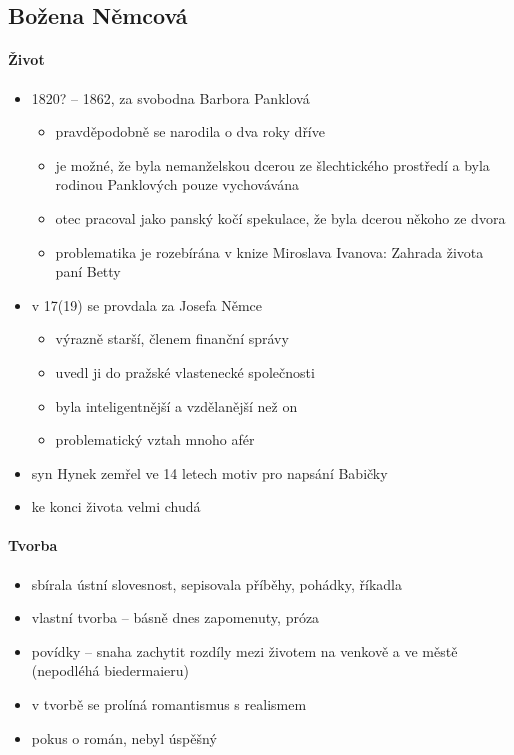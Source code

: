 \subsection{Božena Němcová}
\paragraph{Život}
\begin{itemize}
\item 1820? -- 1862, za svobodna Barbora Panklová
	\begin{itemize}
	\item pravděpodobně se narodila o dva roky dříve
	\item je možné, že byla nemanželskou dcerou ze šlechtického prostředí a byla rodinou Panklových pouze vychovávána
	\item otec pracoval jako panský kočí \ra spekulace, že byla dcerou někoho ze dvora
	\item problematika je rozebírána v knize Miroslava Ivanova: Zahrada života paní Betty
	\end{itemize}
\item v 17(19) se provdala za Josefa Němce
	\begin{itemize}
	\item výrazně starší, členem finanční správy
	\item uvedl ji do pražské vlastenecké společnosti
	\item byla inteligentnější a vzdělanější než on
	\item problematický vztah \ra mnoho afér
	\end{itemize}
\item syn Hynek zemřel ve 14 letech \ra motiv pro napsání Babičky
\item ke konci života velmi chudá
\end{itemize}

\paragraph{Tvorba}
\begin{itemize}
\item sbírala ústní slovesnost, sepisovala příběhy, pohádky, říkadla
\item vlastní tvorba -- básně dnes zapomenuty, próza
\item povídky -- snaha zachytit rozdíly mezi životem na venkově a ve městě (nepodléhá biedermaieru)
\item v tvorbě se prolíná romantismus s realismem
\item pokus o román, nebyl úspěšný
\end{itemize}

